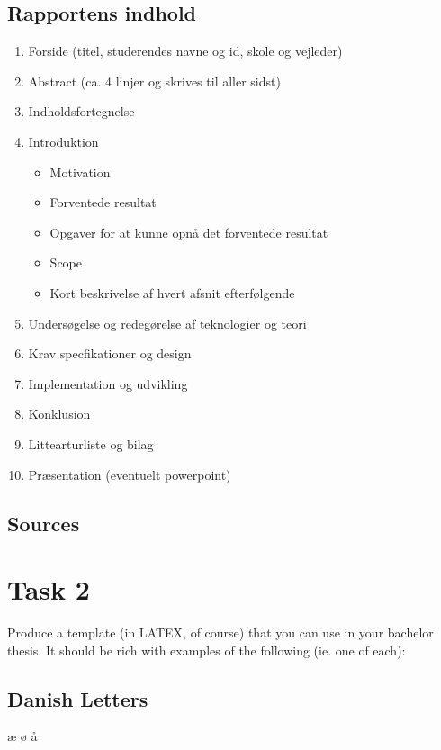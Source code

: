 \documentclass{article}
\begin{document}
    \subsection*{Rapportens indhold}
    \begin{enumerate}
        \item Forside (titel, studerendes navne og id, skole og vejleder)
        \item Abstract (ca. 4 linjer og skrives til aller sidst)
        \item Indholdsfortegnelse 
        \item Introduktion
        \begin{itemize}
            \item Motivation
            \item Forventede resultat
            \item Opgaver for at kunne opnå det forventede resultat
            \item Scope
            \item Kort beskrivelse af hvert afsnit efterfølgende
        \end{itemize}
        \item Undersøgelse og redegørelse af teknologier og teori
        \item Krav specfikationer og design
        \item Implementation og udvikling 
        \item Konklusion
        \item Littearturliste og bilag 
        \item Præsentation (eventuelt powerpoint)
    \end{enumerate}

    \subsection{Sources}

\section{Task 2}

    Produce a template (in LATEX, of course) that you can use in your bachelor
    thesis. It should be rich with examples of the following (ie. one of each):

    \subsection{Danish Letters}
    æ ø å
\end{document}
